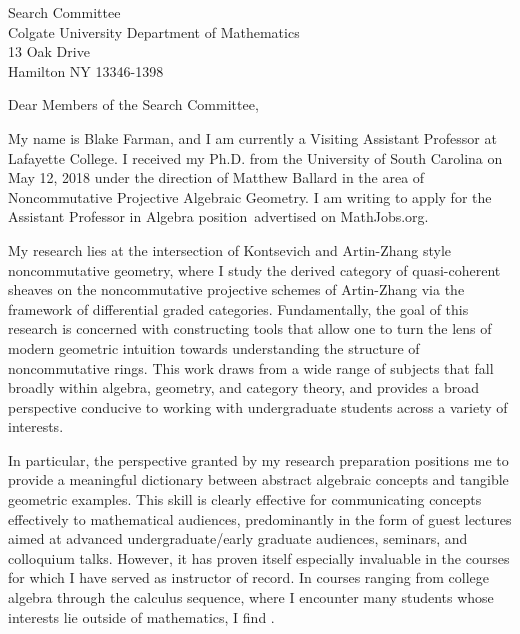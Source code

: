 \documentclass[10pt]{letter}
\date{\today}
\def\position{Assistant Professor in Algebra position}
\def\posloc{MathJobs.org}
\begin{document}
\begin{letter}{
    Search Committee\\
    Colgate University Department of Mathematics\\
    13 Oak Drive\\
    Hamilton NY 13346-1398
  }
  \opening{Dear Members of the Search Committee,}


    My name is Blake Farman, and I am currently a Visiting Assistant Professor at Lafayette College.
  I received my Ph.D. from the University of South Carolina on May 12, 2018 under the direction of Matthew Ballard in the area of Noncommutative Projective Algebraic Geometry.
  I am writing to apply for the \position\ advertised on \posloc.

  My research lies at the intersection of Kontsevich and Artin-Zhang style noncommutative geometry, where I study the derived category of quasi-coherent sheaves on the noncommutative projective schemes of Artin-Zhang via the framework of differential graded categories.
  Fundamentally, the goal of this research is concerned with constructing tools that allow one to turn the lens of modern geometric intuition towards understanding the structure of noncommutative rings.
  This work draws from a wide range of subjects that fall broadly within algebra, geometry, and category theory, and provides a broad perspective conducive to working with undergraduate students across a variety of interests.

  In particular, the perspective granted by my research preparation positions me to provide a meaningful dictionary between abstract algebraic concepts and tangible geometric examples.
  This skill is clearly effective for communicating concepts effectively to mathematical audiences, predominantly in the form of guest lectures aimed at advanced undergraduate/early graduate audiences, seminars, and colloquium talks.
  However, it has proven itself especially invaluable in the courses for which I have served as instructor of record.
  In courses ranging from college algebra through the calculus sequence, where I encounter many students whose interests lie outside of mathematics, I find .
  

  


\end{letter}
\end{document}

